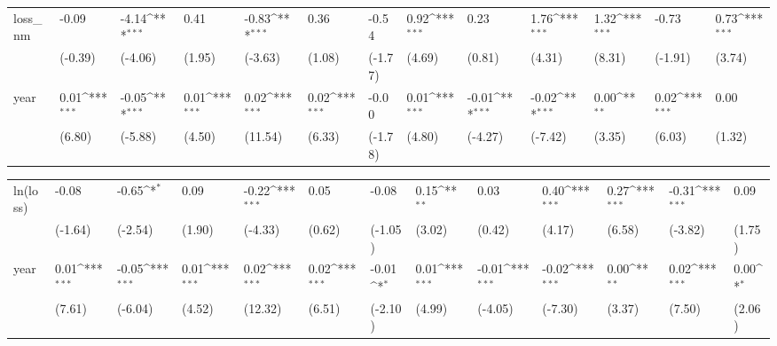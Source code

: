 \def\sym#1{\ifmmode^{#1}\else\(^{#1}\)\fi}
\begin{tabular}{p{1.5cm} p{1.7cm} p{1.7cm} p{1.7cm}  p{1.7cm} p{1.7cm} p{1.7cm} p{1.7cm} p{1.7cm}  p{1.7cm} p{1.7cm} p{1.7cm} p{1.7cm} }
\hline
loss\_nm         &    -0.09         &    -4.14\sym{***}&     0.41         &    -0.83\sym{***}&     0.36         &    -0.54         &     0.92\sym{***}&     0.23         &     1.76\sym{***}&     1.32\sym{***}&    -0.73         &     0.73\sym{***}\\
                &  (-0.39)         &  (-4.06)         &   (1.95)         &  (-3.63)         &   (1.08)         &  (-1.77)         &   (4.69)         &   (0.81)         &   (4.31)         &   (8.31)         &  (-1.91)         &   (3.74)         \\
year            &     0.01\sym{***}&    -0.05\sym{***}&     0.01\sym{***}&     0.02\sym{***}&     0.02\sym{***}&    -0.00         &     0.01\sym{***}&    -0.01\sym{***}&    -0.02\sym{***}&     0.00\sym{**} &     0.02\sym{***}&     0.00         \\
                &   (6.80)         &  (-5.88)         &   (4.50)         &  (11.54)         &   (6.33)         &  (-1.78)         &   (4.80)         &  (-4.27)         &  (-7.42)         &   (3.35)         &   (6.03)         &   (1.32)         \\
\end{tabular}
\def\sym#1{\ifmmode^{#1}\else\(^{#1}\)\fi}
\begin{tabular}{p{1.5cm} p{1.7cm} p{1.7cm} p{1.7cm}  p{1.7cm} p{1.7cm} p{1.7cm} p{1.7cm} p{1.7cm}  p{1.7cm} p{1.7cm} p{1.7cm} p{1.7cm} }
\hline
ln(loss)        &    -0.08         &    -0.65\sym{*}  &     0.09         &    -0.22\sym{***}&     0.05         &    -0.08         &     0.15\sym{**} &     0.03         &     0.40\sym{***}&     0.27\sym{***}&    -0.31\sym{***}&     0.09         \\
                &  (-1.64)         &  (-2.54)         &   (1.90)         &  (-4.33)         &   (0.62)         &  (-1.05)         &   (3.02)         &   (0.42)         &   (4.17)         &   (6.58)         &  (-3.82)         &   (1.75)         \\
year            &     0.01\sym{***}&    -0.05\sym{***}&     0.01\sym{***}&     0.02\sym{***}&     0.02\sym{***}&    -0.01\sym{*}  &     0.01\sym{***}&    -0.01\sym{***}&    -0.02\sym{***}&     0.00\sym{**} &     0.02\sym{***}&     0.00\sym{*}  \\
                &   (7.61)         &  (-6.04)         &   (4.52)         &  (12.32)         &   (6.51)         &  (-2.10)         &   (4.99)         &  (-4.05)         &  (-7.30)         &   (3.37)         &   (7.50)         &   (2.06)         \\
\end{tabular}
